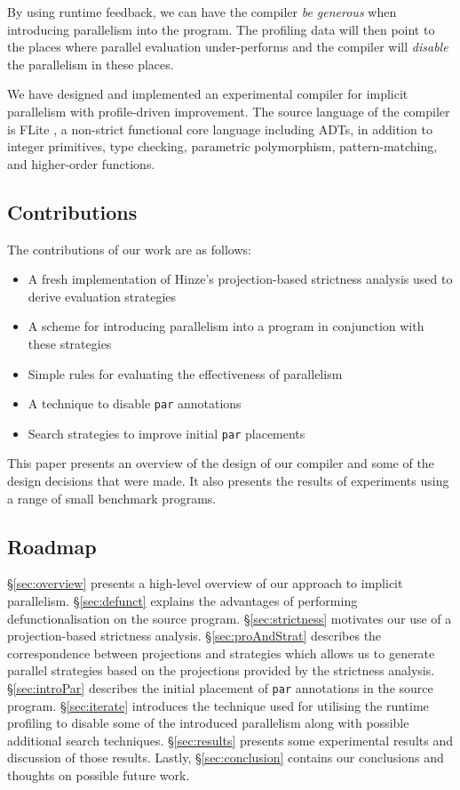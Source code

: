 By using runtime feedback, we can have the compiler \emph{be generous} when
introducing parallelism into the program. The profiling data will then point to
the places where parallel evaluation under-performs and the compiler will
\emph{disable} the parallelism in these places. 


We have designed and implemented an experimental compiler for implicit
parallelism with profile-driven improvement. The source language of the
compiler is FLite \citep{naylor2010reduceron}, a non-strict functional core
language including ADTs, in addition to integer primitives, type checking,
parametric polymorphism, pattern-matching, and higher-order functions. 

\subsection{Contributions}

The contributions of our work are as follows:

\begin{itemize}
    \item A fresh implementation of Hinze's projection-based strictness analysis \citep{hinze1995projection}
        used to derive evaluation strategies
    \item A scheme for introducing parallelism into a program in conjunction with these
        strategies
    \item Simple rules for evaluating the effectiveness of parallelism
    \item A technique to disable \verb-par- annotations
    \item Search strategies to improve initial \verb-par- placements
\end{itemize}


This paper presents an overview of the design of our compiler and some of the
design decisions that were made.  It also presents the results of experiments
using a range of small benchmark programs.

\subsection{Roadmap}

\S\ref{sec:overview} presents a high-level overview of our approach to implicit
parallelism.  \S\ref{sec:defunct} explains the advantages of performing
defunctionalisation on the source program. \S\ref{sec:strictness} motivates our
use of a projection-based strictness analysis.  \S\ref{sec:proAndStrat}
describes the correspondence between projections and strategies which allows us
to generate parallel strategies based on the projections provided by the
strictness analysis. \S\ref{sec:introPar} describes the initial placement of
\verb-par- annotations in the source program. \S\ref{sec:iterate} introduces
the technique used for utilising the runtime profiling to disable some of the
introduced parallelism along with possible additional search techniques.
\S\ref{sec:results} presents some experimental results and discussion of those
results. Lastly, \S\ref{sec:conclusion} contains our conclusions and thoughts
on possible future work.


